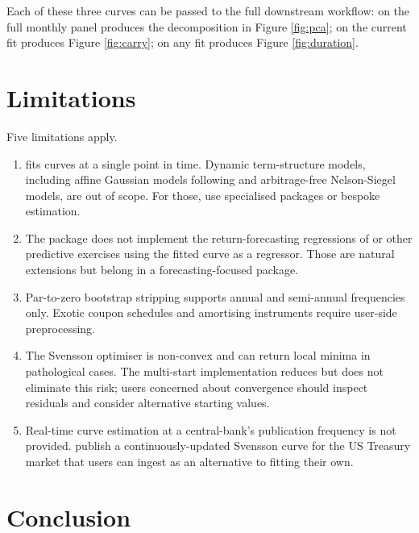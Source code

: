 Each of these three curves can be passed to the full downstream
workflow:  on the full monthly panel produces the
decomposition in Figure \ref{fig:pca};  on the
current fit produces Figure \ref{fig:carry}; 
on any fit produces Figure \ref{fig:duration}.

\section{Limitations}\label{limitations}

Five limitations apply.

\begin{enumerate}
\def\labelenumi{\arabic{enumi}.}
\tightlist
\item
   fits curves at a single point in time.
  Dynamic term-structure models, including affine Gaussian models
  following \citet{ang2003no} and arbitrage-free Nelson-Siegel models,
  are out of scope. For those, use specialised packages or
  bespoke estimation.
\item
  The package does not implement the return-forecasting
  regressions of \citet{cochrane2005bond} or other predictive exercises
  using the fitted curve as a regressor. Those are natural
  extensions but belong in a forecasting-focused package.
\item
  Par-to-zero bootstrap stripping supports annual and semi-annual
  frequencies only. Exotic coupon schedules and amortising
  instruments require user-side preprocessing.
\item
  The Svensson optimiser is non-convex and can return local
  minima in pathological cases. The multi-start implementation
  reduces but does not eliminate this risk; users concerned about
  convergence should inspect residuals and consider alternative
  starting values.
\item
  Real-time curve estimation at a central-bank's publication
  frequency is not provided. \citet{gurkaynak2007us} publish a
  continuously-updated Svensson curve for the US Treasury market
  that users can ingest as an alternative to fitting their own.
\end{enumerate}

\section{Conclusion}\label{conclusion}

